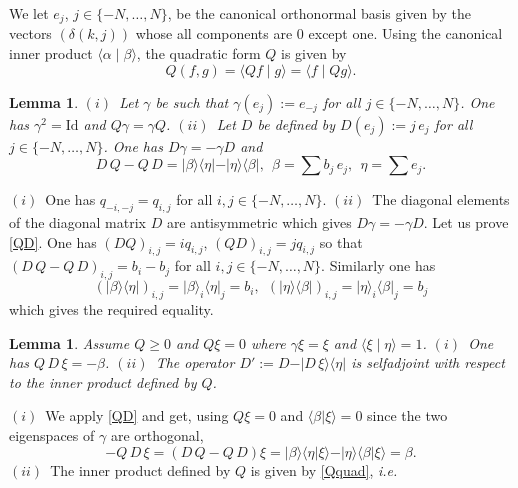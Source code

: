 \documentclass{amsart}
\newtheorem{lem}[thm]{Lemma}
\def\id{{\rm id}}
\newcommand{\ie}{{\it i.e.\/}\ }
\def\id{{\mbox{Id}}}
\def\id{{\rm id}}
\def\id{{\mbox{Id}}}
\begin{document}
We let $e_j$, $j\in \{-N,\ldots,N\}$, be the canonical orthonormal basis given by the vectors $(\delta(k,j))$ whose all components are $0$ except one. Using the canonical inner product $\langle \alpha\mid \beta\rangle$, the quadratic form $Q$ is given by 
\begin{equation}\label{Qquad}
	Q(f,g)=\langle Q f\mid g\rangle=\langle  f\mid Q g\rangle.
\end{equation}

\begin{lem}\label{basics} $(i)$~Let $\gamma$ be such that $\gamma(e_j):=e_{-j}$ for all $j\in \{-N,\ldots,N\}$. One has $\gamma^2=\id$ and $Q\gamma=\gamma Q$.\newline
$(ii)$~Let $D$ be defined by $D(e_j):=j\,e_{j}$ for all $j\in \{-N,\ldots,N\}$. One has $D\gamma=-\gamma D$ and 
\begin{equation}\label{QD}
D\,	Q-Q\, D=\vert \beta\rangle\langle \eta\vert -\vert \eta\rangle\langle \beta\vert, \ \ \beta=\sum b_j\,e_j,\ \ \eta=\sum e_j.
\end{equation}	
\end{lem}
\proof $(i)$~One has $q_{-i,-j}=q_{i,j}$ for all $i,j\in \{-N,\ldots,N\}$.\newline
$(ii)$~The diagonal elements of the diagonal matrix $D$ are antisymmetric which gives $D\gamma=-\gamma D$. Let us prove \eqref{QD}. One has $(DQ)_{i,j}=iq_{i,j}$, $(QD)_{i,j}=jq_{i,j}$ so that $(D\,	Q-Q\, D)_{i,j}=b_i-b_j$ for all $i,j\in \{-N,\ldots,N\}$. Similarly one has 
$$
(\vert \beta\rangle\langle \eta\vert)_{i,j}=\vert \beta\rangle_i\langle \eta\vert_j=b_i, \ \ (\vert \eta\rangle\langle \beta\vert)_{i,j}=\vert \eta\rangle_i\langle \beta\vert_j=b_j
$$
which gives the required equality.\endproof 
\begin{lem}\label{key} Assume $Q\geq 0$ and $Q\xi=0$ where $\gamma \xi=\xi$ and $\langle \xi\mid \eta\rangle=1$. \newline
$(i)$~One has $Q\, D\,\xi=-\beta $.\newline
$(ii)$~The operator $D':=D-\vert D\,\xi\rangle\langle \eta\vert$ is selfadjoint with respect to the inner product defined by $Q$.	
\end{lem}
\proof $(i)$~We apply \eqref{QD} and get, using  $Q\xi=0$ and $\langle \beta\vert \xi \rangle=0$ since the two eigenspaces of $\gamma$ are orthogonal,
$$
-Q\, D\,\xi=(D\,	Q-Q\, D)\xi=\vert \beta\rangle\langle \eta\vert \xi\rangle -\vert \eta\rangle\langle \beta\vert \xi \rangle=\beta.
$$
$(ii)$~The inner product defined by $Q$ is given by \eqref{Qquad}, \ie 
\end{document}
